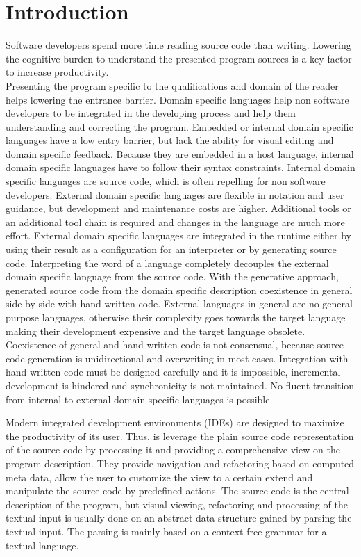 \chapter{Introduction}
\label{cha:introduction}
Software developers spend more time reading source code than writing. Lowering the cognitive burden to understand the presented program sources is a key factor to increase productivity. \\

Presenting the program specific to the qualifications and domain of the reader helps lowering the entrance barrier. Domain specific languages help non software developers to be integrated in the developing process and help them understanding and correcting the program. Embedded or internal domain specific languages have a low entry barrier, but lack the ability for visual editing and domain specific feedback. Because they are embedded in a host language, internal domain specific languages have to follow their syntax constraints. Internal domain specific languages are source code, which is often repelling for non software developers. External domain specific languages are flexible in notation and user guidance, but development and maintenance costs are higher. Additional tools or an additional tool chain is required and changes in the language are much more effort. External domain specific languages are integrated in the runtime either by using their result as a configuration for an interpreter or by generating source code. Interpreting the word of a language completely decouples the external domain specific language from the source code. With the generative approach, generated source code from the domain specific description coexistence in general side by side with hand written code. External languages in general are no general purpose languages, otherwise their complexity goes towards the target language making their development expensive and the target language obsolete. Coexistence of general and hand written code is not consensual, because source code generation is unidirectional and overwriting in most cases. Integration with hand written code must be designed carefully and it is impossible, incremental development is hindered and synchronicity is not maintained. No fluent transition from internal to external domain specific languages is possible.   

Modern integrated development environments (IDEs) are designed to maximize the productivity of its user. Thus, is leverage the plain source code representation of the source code by processing it and providing a comprehensive view on the program description. They provide navigation and refactoring based on computed meta data, allow the user to customize the view to a certain extend and manipulate the source code by predefined actions. The source code is the central description of the program, but visual viewing, refactoring and processing of the textual input is usually done on an abstract data structure gained by parsing the textual input. The parsing is mainly based on a context free grammar for a textual language. 


